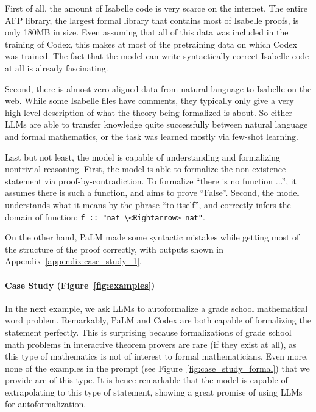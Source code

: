 \documentclass{article}
\begin{document}
First of all, the amount of Isabelle code is very scarce on the internet. The entire AFP library, the largest formal library that contains most of Isabelle proofs, is only 180MB in size. Even assuming that all of this data was included in the training of Codex, this makes at most  of the pretraining data on which Codex was trained. The fact that the model can write syntactically correct Isabelle code at all is already fascinating.

Second, there is almost zero aligned data from natural language to Isabelle on the web.
While some Isabelle files have comments, they typically only give a very high level description of what the theory being formalized is about.
So either LLMs are able to transfer knowledge quite successfully between natural language and formal mathematics, or the task was learned mostly via few-shot learning. 

Last but not least, the model is capable of understanding and formalizing nontrivial reasoning. First, the model is able to formalize the non-existence statement via proof-by-contradiction. To formalize ``there is no function ...'', it assumes there is such a function, and aims to prove ``False''. Second, the model understands what it means by the phrase ``to itself'', and correctly infers the domain of function: \verb|f :: "nat \<Rightarrow> nat"|.

On the other hand, PaLM made some syntactic mistakes while getting most of the structure of the proof correctly, with outputs shown in Appendix~\ref{appendix:case_study_1}. 





\paragraph{Case Study  (Figure~\ref{fig:examples})} In the next example, we ask LLMs to autoformalize a grade school mathematical word problem. Remarkably, PaLM and Codex are both capable of formalizing the statement perfectly. This is surprising because formalizations of grade school math problems in interactive theorem provers are rare (if they exist at all), as this type of mathematics is not of interest to formal mathematicians. Even more, none of the examples in the prompt (see Figure~\ref{fig:case_study_formal}) that we provide are of this type. It is hence remarkable that the model is capable of extrapolating to this type of statement, showing a great promise of using LLMs for autoformalization.
\end{document}
